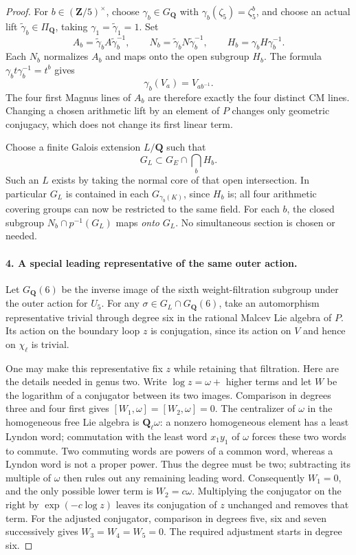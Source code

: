 \begin{proof}
For $b\in(\mathbf Z/5)^\times$, choose
$\gamma_b\in G_{\mathbf Q}$ with
$\gamma_b(\zeta_5)=\zeta_5^b$, and choose an actual lift
$\widetilde\gamma_b\in\Pi_{\mathbf Q}$, taking
$\gamma_1=\widetilde\gamma_1=1$. Set
\[
 A_b=\widetilde\gamma_b A\widetilde\gamma_b^{-1},\qquad
 N_b=\widetilde\gamma_b N\widetilde\gamma_b^{-1},\qquad
 H_b=\gamma_bH\gamma_b^{-1}.
 \tag{X5.4}
\]
Each $N_b$ normalizes $A_b$ and maps onto the open subgroup
$H_b$. The formula
$\gamma_b t\gamma_b^{-1}=t^b$ gives
\[
 \gamma_b(V_a)=V_{ab^{-1}}.
\]
The four first Magnus lines of $A_b$ are therefore exactly
the four distinct CM lines. Changing a chosen arithmetic
lift by an element of $P$ changes only geometric conjugacy,
which does not change its first linear term.

Choose a finite Galois extension $L/\mathbf Q$ such that
\[
 G_L\subset G_E\cap\bigcap_b H_b.
 \tag{X5.5}
\]
Such an $L$ exists by taking the normal core of that open
intersection. In particular $G_L$ is contained in each
$G_{\gamma_b(K)}$, since $H_b$ is; all four arithmetic
covering groups can now be restricted to the same field.
For each $b$, the closed subgroup
$N_b\cap p^{-1}(G_L)$ maps \emph{onto} $G_L$.
No simultaneous section is chosen or needed.

\paragraph{4. A special leading representative of the same outer action.}
Let $G_{\mathbf Q}(6)$ be the inverse image of the sixth
weight-filtration subgroup under the outer action for
$U_5$. For any
$\sigma\in G_L\cap G_{\mathbf Q}(6)$, take an automorphism
representative trivial through degree six in the rational
Malcev Lie algebra of $P$. Its action on the boundary loop
$z$ is conjugation, since its action on $V$ and hence on
$\chi_\ell$ is trivial.

One may make this representative fix $z$ while retaining
that filtration. Here are the details needed in genus two.
Write $\log z=\omega+$ higher terms and let $W$ be the
logarithm of a conjugator between its two images. Comparison
in degrees three and four first gives
$[W_1,\omega]=[W_2,\omega]=0$. The centralizer
of $\omega$ in the homogeneous free Lie algebra is
$\mathbf Q_\ell\omega$: a nonzero homogeneous element has
a least Lyndon word; commutation with the least word
$x_1y_1$ of $\omega$ forces these two words to commute.
Two commuting words are powers of a common word, whereas
a Lyndon word is not a proper power. Thus the degree must
be two; subtracting its multiple of $\omega$ then rules
out any remaining leading word. Consequently $W_1=0$,
and the only possible lower term is $W_2=c\omega$.
Multiplying the conjugator on the right by
$\exp(-c\log z)$ leaves its conjugation of $z$ unchanged
and removes that term. For the adjusted conjugator,
comparison in degrees five, six and seven successively
gives $W_3=W_4=W_5=0$. The required adjustment starts in degree
six.


\end{proof}
